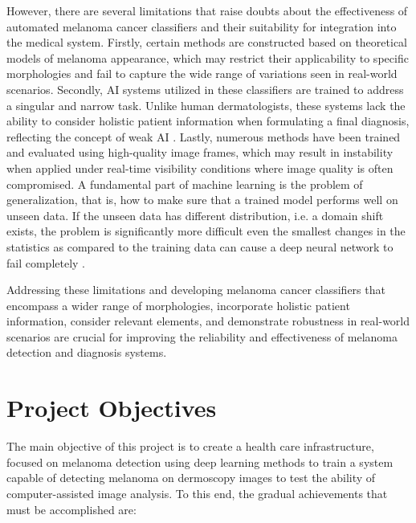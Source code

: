 However, there are several limitations that raise doubts about the effectiveness of automated melanoma cancer classifiers and their suitability for integration into the medical system. Firstly, certain methods are constructed based on theoretical models of melanoma appearance, which may restrict their applicability to specific morphologies and fail to capture the wide range of variations seen in real-world scenarios. Secondly, AI systems utilized in these classifiers are trained to address a singular and narrow task. Unlike human dermatologists, these systems lack the ability to consider holistic patient information when formulating a final diagnosis, reflecting the concept of weak AI \cite{WeakAI}. Lastly, numerous methods have been trained and evaluated using high-quality image frames, which may result in instability when applied under real-time visibility conditions where image quality is often compromised. A fundamental part of machine learning is the problem of generalization, that
is, how to make sure that a trained model performs well on unseen data. If the
unseen data has different distribution, i.e. a domain shift exists, the problem
is significantly more difficult even the smallest changes in the statistics as
compared to the training data can cause a deep neural network to fail
completely \cite{DomainShift}. \newline

Addressing these limitations and developing melanoma cancer classifiers that
encompass a wider range of morphologies, incorporate holistic patient
information, consider relevant elements, and demonstrate robustness in
real-world scenarios are crucial for improving the reliability and
effectiveness of melanoma detection and diagnosis systems. \newline

\section{Project Objectives}

The main objective of this project is to create a health care infrastructure,
focused on melanoma detection using deep learning methods to train a system
capable of detecting melanoma on dermoscopy images to test the ability of
computer-assisted image analysis. To this end, the gradual achievements that
must be accomplished are:

